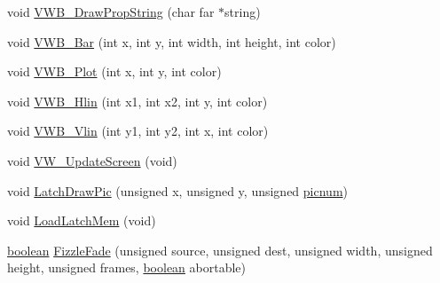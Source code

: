 \begin{DoxyCompactItemize}
void \hyperlink{ID__VH_8C_a8efd746c0d9c5c4e7015b569e4f6bb24}{VWB\_\-DrawPropString} (char far $\ast$string)
\item 
void \hyperlink{ID__VH_8C_a5496b8df6f9a9de1b3f788ce6951c865}{VWB\_\-Bar} (int x, int y, int width, int height, int color)
\item 
void \hyperlink{ID__VH_8C_a9ebc1393c381167c87778c7270148f4d}{VWB\_\-Plot} (int x, int y, int color)
\item 
void \hyperlink{ID__VH_8C_a5438374e81536560343d6be41205ecf6}{VWB\_\-Hlin} (int x1, int x2, int y, int color)
\item 
void \hyperlink{ID__VH_8C_adad5945cddefd75d9c787644201b242f}{VWB\_\-Vlin} (int y1, int y2, int x, int color)
\item 
void \hyperlink{ID__VH_8C_a0968c2c5350fb70b79df6fdc2733e243}{VW\_\-UpdateScreen} (void)
\item 
void \hyperlink{ID__VH_8C_a0170b65c8e23e18b960bde1e8908887b}{LatchDrawPic} (unsigned x, unsigned y, unsigned \hyperlink{WL__TEXT_8C_a38ee8916c0c328929ad672895daca6d6}{picnum})
\item 
void \hyperlink{ID__VH_8C_a872a52095cf999d5cf5b93deac17193a}{LoadLatchMem} (void)
\item 
\hyperlink{ID__HEAD_8H_a7c6368b321bd9acd0149b030bb8275ed}{boolean} \hyperlink{ID__VH_8C_ae2893c63915f70a503b1a661d0416421}{FizzleFade} (unsigned source, unsigned dest, unsigned width, unsigned height, unsigned frames, \hyperlink{ID__HEAD_8H_a7c6368b321bd9acd0149b030bb8275ed}{boolean} abortable)
\end{DoxyCompactItemize}
